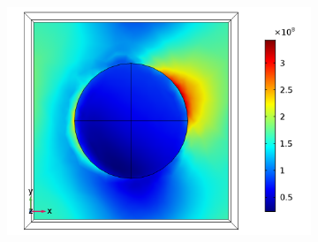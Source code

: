 \begin{figure}[htb!]
\begin{subfigure}{0.32\textwidth}
        \includegraphics[width=\linewidth]{figures/ch4/S5A/FieldDistribution/phi25/Sample5A_TM_Slice@z=0_wl=300_phi=25.png}
   \end{subfigure}


\end{figure}
